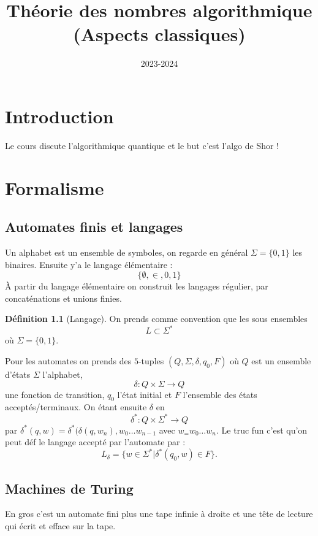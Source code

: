 \documentclass[a4paper,12pt]{book}
\title{Théorie des nombres algorithmique\\ \small{(Aspects classiques)}}
\date{2023-2024}
\theoremstyle{plain}
\theoremstyle{definition}
\newtheorem{defn}[subsection]{Définition}
\theoremstyle{remark}
\begin{document}
\maketitle
\tableofcontents
\chapter*{Introduction}

Le cours discute l'algorithmique quantique et le but c'est l'algo de 
Shor \cite{Shor_1997}!

\chapter{Formalisme}
\section{Automates finis et langages}
Un alphabet est un ensemble de symboles, on regarde en général $\Sigma=
\{0,1\}$ les binaires. Ensuite y'a le langage élémentaire :
\[\{\emptyset, \in, 0, 1\}\]
À partir du langage élémentaire on construit les langages régulier,
par concaténations et unions finies.

\begin{defn}[Langage]
    On prends comme convention que les sous ensembles 
    \[L\subset\Sigma^*\]
    où $\Sigma = \{0,1\}$.
\end{defn}

Pour les automates on prends des $5$-tuples $(Q,\Sigma,\delta, q_0, F)$
où $Q$ est un ensemble d'états $\Sigma$ l'alphabet, 
\[\delta\colon Q\times \Sigma \to Q\]
une fonction de transition, $q_0$ l'état initial et $F$ l'ensemble des
états acceptés/terminaux. On étant ensuite $\delta$ en 
    \[\delta^*\colon Q\times \Sigma^*\to Q\]
    par $\delta^*(q, w)=\delta^*(\delta(q, w_n),w_0\ldots w_{n-1}$ avec
    $w_=w_0\ldots w_n$.
Le truc fun c'est qu'on peut déf le langage accepté par l'automate par :
\[L_{\delta}=\{w\in \Sigma^*| \delta^*(q_0,w)\in F\}.\]



\section{Machines de Turing}
En gros c'est un automate fini plus une tape infinie à droite et une
tête de lecture qui écrit et efface sur la tape.
\end{document}
